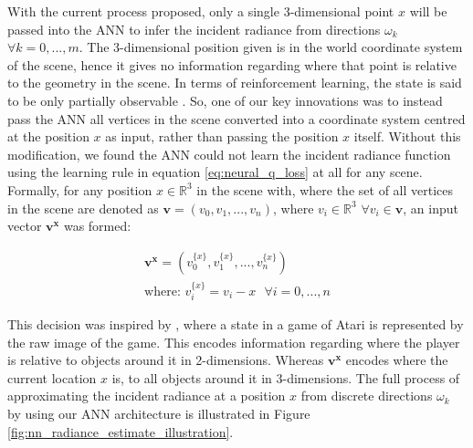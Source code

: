 \documentclass[../dissertation.tex]{subfiles}
\begin{document}
With the current process proposed, only a single 3-dimensional point $x$ will be passed into the ANN to infer the incident radiance from directions $\omega_k$ $\forall k = 0, ..., m$. The 3-dimensional position given is in the world coordinate system of the scene, hence it gives no information regarding where that point is relative to the geometry in the scene. In terms of reinforcement learning, the state is said to be only partially observable \cite{sutton2011reinforcement}. So, one of our key innovations was to instead pass the ANN all vertices in the scene converted into a coordinate system centred at the position $x$ as input, rather than passing the position $x$ itself. Without this modification, we found the ANN could not learn the incident radiance function using the learning rule in equation \ref{eq:neural_q_loss} at all for any scene. Formally, for any position $x \in \mathbb{R}^3$ in the scene with, where the set of all vertices in the scene are denoted as $\mathbf{v} = (v_0, v_1, ..., v_n)$, where $v_i \in \mathbb{R}^3$ $\forall v_i \in \mathbf{v}$, an input vector $\mathbf{v^x}$ was formed:

\begin{gather*}
\mathbf{v^x} = (v^{\{x\}}_0, v^{\{x\}}_1, ..., v^{\{x\}}_n)\\
\text{where: } v^{\{x\}}_i = v_i - x \ \ \ \forall i = 0, ..., n \nonumber
\end{gather*}

This decision was inspired by \cite{mnih2013playing}, where a state in a game of Atari is represented by the raw image of the game. This encodes information regarding where the player is relative to objects around it in 2-dimensions. Whereas $\mathbf{v^x}$ encodes where the current location $x$ is, to all objects around it in 3-dimensions. The full process of approximating the incident radiance at a position $x$ from discrete directions $\omega_k$ by using our ANN architecture is illustrated in Figure \ref{fig:nn_radiance_estimate_illustration}.
\end{document}
